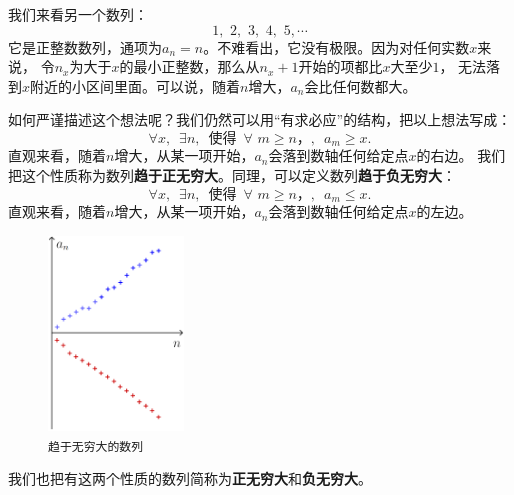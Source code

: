 \documentclass[12pt,UTF8]{ctexbook}
\begin{document}
我们来看另一个数列：
$$ 1,\,\,2,\,\,3,\,\,4,\,\,5,\cdots $$
它是正整数数列，通项为$a_n = n$。不难看出，它没有极限。因为对任何实数$x$来说，
令$n_x$为大于$x$的最小正整数，那么从$n_x+1$开始的项都比$x$大至少$1$，
无法落到$x$附近的小区间里面。可以说，随着$n$增大，$a_n$会比任何数都大。

如何严谨描述这个想法呢？我们仍然可以用“有求必应”的结构，把以上想法写成：
$$ \forall x, \,\,\, \exists n, \,\,\,\mbox{使得} \,\,\,\forall \,\, m \geqslant n，,\,\,\, a_m \geqslant x.$$
直观来看，随着$n$增大，从某一项开始，$a_n$会落到数轴任何给定点$x$的右边。
我们把这个性质称为数列\textbf{趋于正无穷大}。同理，可以定义数列\textbf{趋于负无穷大}：
$$\forall x, \,\,\, \exists n, \,\,\,\mbox{使得}\,\,\,\forall \,\, m \geqslant n，,\,\,\, a_m \leqslant x.$$
直观来看，随着$n$增大，从某一项开始，$a_n$会落到数轴任何给定点$x$的左边。

\begin{figure} %
    \vspace{-48pt}
    \flushright
    \includegraphics[width=0.32\textwidth]{数列无穷大1.png}
    \caption*{\texttt{趋于无穷大的数列}}
\end{figure}

我们也把有这两个性质的数列简称为\textbf{正无穷大}和\textbf{负无穷大}。
\end{document}
